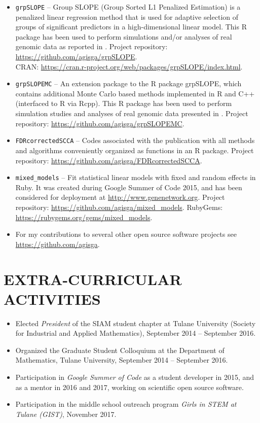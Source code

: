 \documentclass[overlapped, line, 10pt]{res} %
\begin{document}
\begin{resume}
\begin{itemize}
  \item \verb!grpSLOPE! -- Group SLOPE (Group Sorted L1 Penalized Estimation) is a penalized linear regression method that is used for adaptive selection of groups of significant predictors in a high-dimensional linear model. This R package has been used to perform simulations and/or analyses of real genomic data as reported in \cite{Gossmann2017-yu, brzyski2016}. Project repository: \url{https://github.com/agisga/grpSLOPE}.\\
    CRAN: \url{https://cran.r-project.org/web/packages/grpSLOPE/index.html}.
  \item \verb!grpSLOPEMC! -- An extension package to the R package grpSLOPE, which contains additional Monte Carlo based methods implemented in R and C++ (interfaced to R via Rcpp). This R package has been used to perform simulation studies and analyses of real genomic data presented in \cite{Gossmann2017-yu}. Project repository: \url{https://github.com/agisga/grpSLOPEMC}.
  \item \verb!FDRcorrectedSCCA! -- Codes associated with the publication \cite{Gossmann2017-ln} with all methods and algorithms conveniently organized as functions in an R package. Project repository: \url{https://github.com/agisga/FDRcorrectedSCCA}.
  \item \verb!mixed_models! -- Fit statistical linear models with fixed and random effects in Ruby. It was created during Google Summer of Code 2015, and has been considered for deployment at \url{http://www.genenetwork.org}. Project repository: \url{https://github.com/agisga/mixed_models}. RubyGems: \url{https://rubygems.org/gems/mixed_models}.
  \item For my contributions to several other open source software projects see \url{https://github.com/agisga}.
\end{itemize}


\section{EXTRA-CURRICULAR ACTIVITIES}

\begin{itemize}
  \item Elected {\it President} of the SIAM student chapter at Tulane University (Society for Industrial and Applied Mathematics), September 2014 -- September 2016.
  \item Organized the Graduate Student Colloquium at the Department of Mathematics, Tulane University, September 2014 -- September 2016.
  \item Participation in \emph{Google Summer of Code} as a student developer in 2015, and as a mentor in 2016 and 2017, working on scientific open source software.
  \item Participation in the middle school outreach program \emph{Girls in STEM at Tulane (GIST)}, November 2017.
\end{itemize}


\end{resume}
\end{document}
